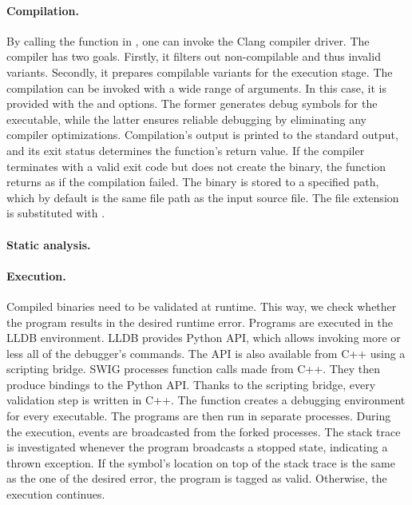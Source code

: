 \paragraph{Compilation.} By calling the  function in 
, one can invoke the Clang compiler driver.
The compiler has two goals.
Firstly, it filters out non-compilable and thus invalid variants.
Secondly, it prepares compilable variants for the execution stage.
The compilation can be invoked with a wide range of arguments.
In this case, it is provided with the  and  options.
The former generates debug symbols for the executable, while the latter 
ensures reliable debugging by eliminating any compiler optimizations.
Compilation's output is printed to the standard output, and its exit status 
determines the function's return value.
If the compiler terminates with a valid exit code but does not create 
the binary, the function returns as if the compilation failed.
The binary is stored to a specified path, which by default is the same file 
path as the input source file.
The file extension is substituted with .

\paragraph{Static analysis.}

\paragraph{Execution.} Compiled binaries need to be validated at runtime.
This way, we check whether the program results in the desired runtime error.
Programs are executed in the LLDB environment.
LLDB provides Python API, which allows invoking more or less all of 
the debugger's commands.
The API is also available from C++ using a scripting bridge.
SWIG processes function calls made from C++.
They then produce bindings to the Python API.
Thanks to the scripting bridge, every validation step is written in C++.
The  function creates a debugging environment for every 
executable.
The programs are then run in separate processes.
During the execution, events are broadcasted from the forked processes.
The stack trace is investigated whenever the program broadcasts a stopped 
state, indicating a thrown exception.
If the symbol's location on top of the stack trace is the same as the one of 
the desired error, the program is tagged as valid.
Otherwise, the execution continues.

